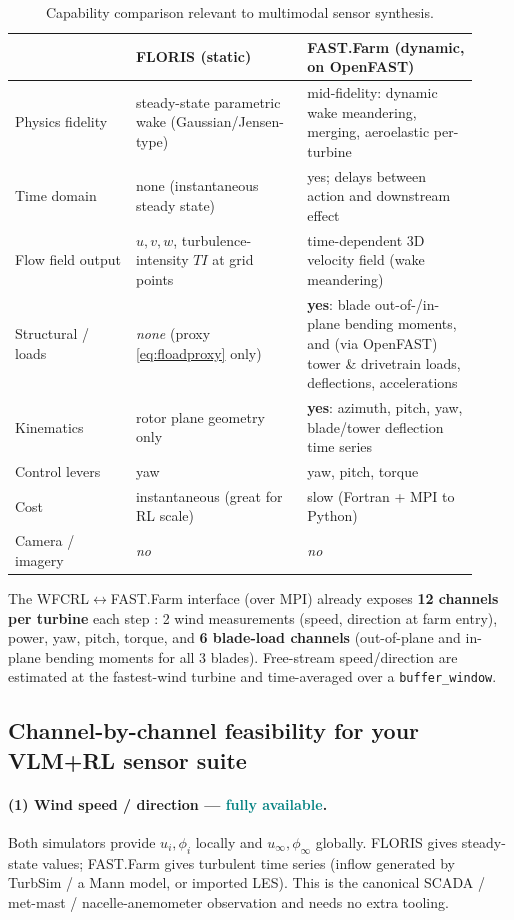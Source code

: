\documentclass[11pt]{article}
\theoremstyle{plain}
\theoremstyle{definition}
\newcommand{\wind}{u_{\infty}}
\newcommand{\dir}{\phi_{\infty}}
\begin{document}
\begin{table}[h]
\centering
\renewcommand{\arraystretch}{1.2}
\begin{tabular}{@{}p{0.24\linewidth} p{0.34\linewidth} p{0.34\linewidth}@{}}
\toprule
 & \textbf{FLORIS} (static) & \textbf{FAST.Farm} (dynamic, on OpenFAST) \\
\midrule
Physics fidelity & steady-state parametric wake (Gaussian/Jensen-type) &
  mid-fidelity: dynamic wake meandering, merging, aeroelastic per-turbine \\
Time domain & none (instantaneous steady state) &
  yes; delays between action and downstream effect \\
Flow field output & $u,v,w$, turbulence-intensity $TI$ at grid points &
  time-dependent 3D velocity field (wake meandering) \\
Structural / loads & \emph{none} (proxy \eqref{eq:floadproxy} only) &
  \textbf{yes}: blade out-of-/in-plane bending moments, and (via OpenFAST) tower
  \& drivetrain loads, deflections, accelerations \\
Kinematics & rotor plane geometry only &
  \textbf{yes}: azimuth, pitch, yaw, blade/tower deflection time series \\
Control levers & yaw & yaw, pitch, torque \\
Cost & instantaneous (great for RL scale) & slow (Fortran + MPI to Python) \\
Camera / imagery & \emph{no} & \emph{no} \\
\bottomrule
\end{tabular}
\caption{Capability comparison relevant to multimodal sensor synthesis.}
\label{tab:simcompare}
\end{table}

The WFCRL$\leftrightarrow$FAST.Farm interface (over MPI) already exposes
\textbf{12 channels per turbine} each step \cite{P1}:
2 wind measurements (speed, direction at farm entry), power, yaw, pitch,
torque, and \textbf{6 blade-load channels} (out-of-plane and in-plane bending
moments for all 3 blades). Free-stream speed/direction are estimated at the
fastest-wind turbine and time-averaged over a \texttt{buffer\_window}.

\subsection{Channel-by-channel feasibility for your VLM+RL sensor suite}

\paragraph{(1) Wind speed / direction --- \textcolor{teal}{fully available}.}
Both simulators provide $u_i,\phi_i$ locally and $\wind,\dir$ globally.
FLORIS gives steady-state values; FAST.Farm gives turbulent time series
(inflow generated by TurbSim / a Mann model, or imported LES). This is the
canonical SCADA / met-mast / nacelle-anemometer observation and needs no extra
tooling.
\end{document}
